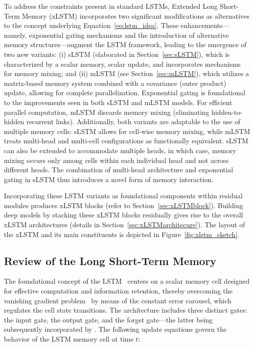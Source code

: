 To address the constraints present in standard LSTMs, Extended Long Short-Term Memory (xLSTM) incorporates two significant modifications as alternatives to the concept underlying Equation~\eqref{eq:lstm_idea}. These enhancements—namely, exponential gating mechanisms and the introduction of alternative memory structures—augment the LSTM framework, leading to the emergence of two new variants: (i) sLSTM (elaborated in Section~\ref{sec:sLSTM}), which is characterized by a scalar memory, scalar update, and incorporates mechanisms for memory mixing; and (ii) mLSTM (see Section~\ref{sec:mLSTM}), which utilizes a matrix-based memory system combined with a covariance (outer product) update, allowing for complete parallelization. Exponential gating is foundational to the improvements seen in both sLSTM and mLSTM models. For efficient parallel computation, mLSTM discards memory mixing (eliminating hidden-to-hidden recurrent links). Additionally, both variants are adaptable to the use of multiple memory cells: sLSTM allows for cell-wise memory mixing, while mLSTM treats multi-head and multi-cell configurations as functionally equivalent. sLSTM can also be extended to accommodate multiple heads, in which case, memory mixing occurs only among cells within each individual head and not across different heads. The combination of multi-head architecture and exponential gating in sLSTM thus introduces a novel form of memory interaction.

Incorporating these LSTM variants as foundational components within residual modules produces xLSTM blocks (refer to Section~\ref{sec:xLSTMblock}). Building deep models by stacking these xLSTM blocks residually gives rise to the overall xLSTM architectures (details in Section~\ref{sec:xLSTMarchitecure}). The layout of the xLSTM and its main constituents is depicted in Figure~\ref{fig:xlstm_sketch}.

\subsection{Review of the Long Short-Term Memory}
\label{sec:orgLSTM}

The foundational concept of the LSTM~\citep{Hochreiter:91,Hochreiter:97nips,Hochreiter:97} centers on a scalar memory cell designed for effective computation and information retention, thereby overcoming the vanishing gradient problem~\citep{Hochreiter:91,Hochreiter:00book} by means of the constant error carousel, which regulates the cell state transitions. The architecture includes three distinct gates: the input gate, the output gate, and the forget gate—the latter being subsequently incorporated by \citet{Gers:00}. The following update equations govern the behavior of the LSTM memory cell at time $t$:

